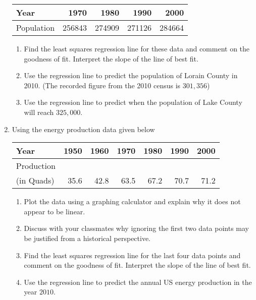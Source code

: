 \begin{enumerate}
\noindent \begin{tabular}{|l|r|r|r|r|} \hline
Year & 1970 & 1980 & 1990 & 2000 \\ 
\hline 
Population & 256843 & 274909 & 271126 & 284664 \\ \hline
\end{tabular}

\begin{enumerate}
 

\item  Find the least squares regression line for these data and comment on the goodness of fit. Interpret the slope of the line of best fit.

\item  Use the regression line to predict the population of Lorain County in 2010.  (The recorded figure from the 2010 census is $301,\!356$)

\item  Use the regression line to predict when the population of Lake County will reach $325,\!000$.

\end{enumerate}
\item Using the energy production data given below

\noindent \begin{tabular}{|l|r|r|r|r|r|r|} \hline
Year & 1950 & 1960 & 1970 & 1980 & 1990 & 2000 \\ 
\hline 
Production & & & & & & \\
(in Quads) & 35.6 & 42.8 & 63.5 & 67.2 & 70.7 & 71.2 \\ \hline
\end{tabular}

\begin{enumerate}

\item  Plot the data using a graphing calculator and explain why it does not appear to be linear.

\item  Discuss with your classmates why ignoring the first two data points may be justified from a historical perspective.  

\item Find the least squares regression line for the last four data points and comment on the goodness of fit. Interpret the slope of the line of best fit.

\item  Use the regression line to predict the annual US energy production in the year $2010$.


\end{enumerate}
\end{enumerate}
